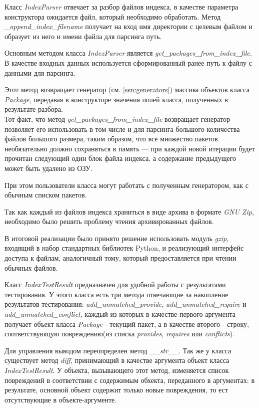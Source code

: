 Класс \textit{IndexParser} отвечает за разбор файлов индекса, в качестве параметра конструктора
ожидается файл, который необходимо обработать. Метод \textit{\_append\_index\_filename} получает на вход
имя директории с целевым файлом и образует из него и имени файла для парсинга
путь.

Основным методом класса \textit{IndexParser} является \textit{get\_packages\_from\_index\_file}.
В качестве входных данных используется сформированный ранее путь к файлу с данными
для парсинга. 

Этот метод возвращает генератор (см. \ref{ssn:generators}) массива объектов класса \textit{Package},
передавая в конструкторе значения полей класса, полученных в результате разбора.\\

Тот факт, что метод \textit{get\_packages\_from\_index\_file} возвращает генератор позволяет
его использовать в том числе и для парсинга большого количества файлов большого размера, 
таким образом, что все множество пакетов необязательно должно сохраняться в память ---
при каждой новой итерации будет прочитан следующий один блок файла индекса, 
а содержание предыдущего может быть удалено из ОЗУ.

При этом пользователи класса могут работать с полученным генератором, как с обычным списком пакетов.

Так как каждый из файлов индекса храниться в виде архива в формате \textit{GNU Zip}, 
необходимо было решить проблему чтения архивированных файлов.

В итоговой реализации было принято решение использовать модуль \textit{gzip}, 
входящий в набор стандартных библиотек Python, и реализующий интерфейс доступа к файлам,
аналогичный тому, который предоставляется при чтении обычных файлов.

Класс \textit{IndexTestResult} предназначен для удобной работы с результатами тестирования. 
У этого класса есть три метода отвечающие за накопление результатов тестирования:
\textit{add\_unmatched\_provide}, \textit{add\_unmatched\_require} и \textit{add\_unmatched\_conflict}, каждый из которых
в качестве первого аргумента получает объект класса \textit{Package} - текущий пакет, а в качестве второго
- строку, соответствующую повреждению(из списка \textit{provides}, \textit{requires} или \textit{conflicts}).

Для управления выводом переопределен метод \textit{\_\_str\_\_}. Так же у класса существует метод \textit{diff},
принимающий в качестве аргумента объект класса \textit{IndexTestResult}. У объекта, 
вызывающего этот метод, изменяется список повреждений в соответствии с содержимым обхекта,
переданного в аргументах: в результате, основной объект содержит только новые повреждения,
то ест отсутствующие в объекте-аргументе.\\

